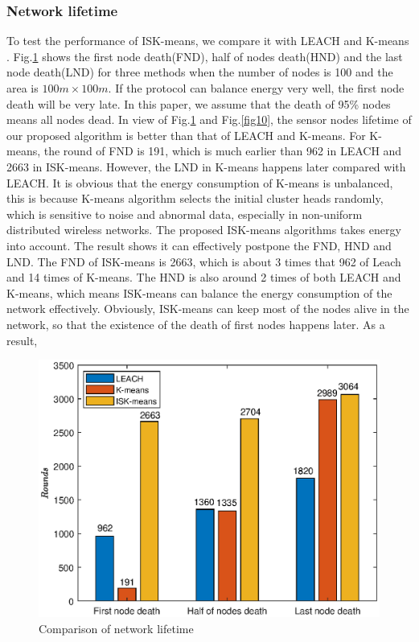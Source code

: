\documentclass[11pt]{report}
\begin{document}
	\subsubsection{Network lifetime}
    To test the performance of ISK-means, we compare it with LEACH \cite{1045297} and K-means \cite{6375088}. Fig.\ref{fig9} shows the first node death(FND), half of nodes death(HND) and the last node death(LND) for three methods when the number of nodes is 100 and the area is $100m \times 100m$. If the protocol can balance energy very well, the first node death will be very late. In this paper, we assume that the death of 95\% nodes means all nodes dead. In view of Fig.\ref{fig9} and Fig.\ref{fig10}, the sensor nodes lifetime of our proposed algorithm is better than that of LEACH and K-means. For K-means, the round of FND is 191, which is much earlier than 962 in LEACH and 2663 in ISK-means. However, the LND in K-means happens later compared with LEACH. It is obvious that the energy consumption of K-means is unbalanced, this is because K-means algorithm selects the initial cluster heads randomly, which is sensitive to noise and abnormal data, especially in non-uniform distributed wireless networks. The proposed ISK-means algorithms takes energy into account. The result shows it can effectively postpone the FND, HND and LND. The FND of ISK-means is 2663, which is about 3 times that 962 of Leach and 14 times of K-means. The HND is also around 2 times of both LEACH and K-means, which means ISK-means can balance the energy consumption of the network effectively. Obviously, ISK-means can keep most of the nodes alive in the network, so that the existence of the death of first nodes happens later. As a result, 

	\begin{figure}[h!]
		\centering
		\includegraphics[width=0.7\linewidth]{three.eps}
		\caption{Comparison of network lifetime}
		\label{fig9}
	\end{figure}
\end{document}
